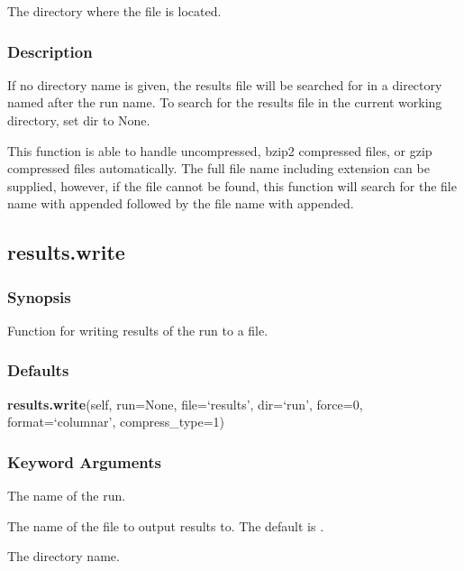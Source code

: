   The directory where the file is located. 




\subsubsection{Description}

If no directory name is given, the results file will be searched for in a directory named after the run name.  To search for the results file in the current working directory, set dir to None.


This function is able to handle uncompressed, bzip2 compressed files, or gzip compressed files automatically.  The full file name including extension can be supplied, however, if the file cannot be found, this function will search for the file name with  appended followed by the file name with  appended.




\newpage

\subsection{results.write}


\subsubsection{Synopsis}

Function for writing results of the run to a file.



\subsubsection{Defaults}

\textsf{\textbf{results.write}(self, run=None, file=`results', dir=`run', force=0, format=`columnar', compress\_type=1)}


\subsubsection{Keyword Arguments}

  The name of the run. 

  The name of the file to output results to.  The default is . 

  The directory name. 


